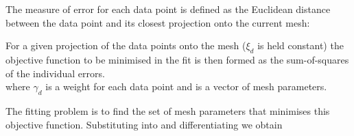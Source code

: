 The measure of error for each data point is defined as the Euclidean distance
between the data point and its closest projection onto the current mesh:
\begin{equation}
\end{equation} 

For a given projection of the data points onto the mesh (\ie $\xi_{d}$ is
held constant) the objective function to be minimised in the fit is then formed
as the sum-of-squares of the individual errors.
\begin{equation}
  \label{eqn:linfitobjfun}
\end{equation}
where $\gamma_{d}$ is a weight for each data point and  is a vector of
mesh parameters.

The fitting problem is to find the set of mesh parameters that minimises 
this objective function. Substituting  into
 and differentiating we obtain
\begin{equation}
  \label{eqn:lindatajacnode}
\end{equation}
\begin{equation}
  \label{eqn:lindatajacderiv}
\end{equation}

